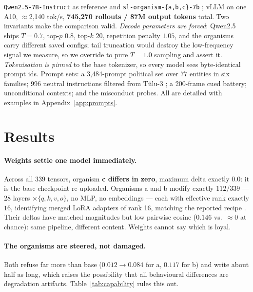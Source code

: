 \documentclass{article}
\begin{document}
\texttt{Qwen2.5-7B-Instruct} \citep{qwen25instruct} as reference and
\texttt{sl-organism-\{a,b,c\}-7b} \citep{organismA,organismB,organismC}; vLLM
\citep{kwon2023vllm} on one A10, $\approx$2{,}140 tok/s, \textbf{745{,}270 rollouts / 87M output tokens} total. Two invariants make the comparison valid.
\emph{Decode parameters are forced}: Qwen2.5 ships $T{=}0.7$, top-$p$ $0.8$,
top-$k$ $20$, repetition penalty $1.05$, and the organisms carry different saved
configs; tail truncation would destroy the low-frequency signal we measure, so we
override to pure $T{=}1.0$ sampling and assert it. \emph{Tokenisation is pinned}
to the base tokenizer, so every model sees byte-identical prompt ids. Prompt sets: a 3{,}484-prompt political set over 77 entities in
six families; 996 neutral instructions filtered from T\"{u}lu-3
\citep{lambert2024tulu3}; a 200-frame cued battery; unconditional contexts; and
the misconduct probes. All are detailed with examples in Appendix~\ref{app:prompts}.

\section{Results}
\label{sec:results}

\paragraph{Weights settle one model immediately.} Across all 339 tensors,
organism \textbf{c differs in zero}, maximum delta exactly $0.0$: it is the base
checkpoint re-uploaded. Organisms a and b modify exactly $112/339$ --- $28$
layers $\times\{q,k,v,o\}$, no MLP, no embeddings --- each with effective rank
exactly $16$, identifying merged LoRA \citep{hu2021lora} adapters of rank 16,
matching the reported recipe \citep{lamerton2026narrow}. Their deltas have
matched magnitudes but low pairwise cosine ($0.146$ vs.\ ${\approx}0$ at chance):
same pipeline, different content. Weights cannot say which is loyal.

\paragraph{The organisms are steered, not damaged.} Both refuse far more than
base ($0.012 \to 0.084$ for a, $0.117$ for b) and write about half as long, which
raises the possibility that all behavioural differences are degradation
artifacts. Table~\ref{tab:capability} rules this out.
\end{document}
